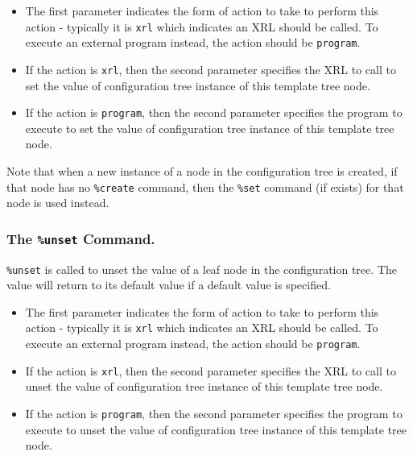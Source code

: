 \documentclass[11pt]{article}
\begin{document}
\begin{itemize}

  \item The first parameter indicates the form of action to take to perform
  this action - typically it is {\tt xrl} which indicates an XRL should
  be called.
  To execute an external program instead, the action should be {\tt program}.

  \item If the action is {\tt xrl}, then the second parameter specifies the
  XRL to call to set the value of configuration tree instance of this template
  tree node.

  \item If the action is {\tt program}, then the second parameter specifies the
  program to execute to set the value of configuration tree instance of this
  template tree node.

\end{itemize}

Note that when a new instance of a node in the configuration tree is created,
if that node has no {\tt \%create} command, then the {\tt \%set}
command (if exists) for that node is used instead.

\subsubsection{The {\tt \%unset} Command.}

{\tt \%unset} is called to unset the value of a leaf node in the
configuration tree.  The value will return to its default value if a
default value is specified.

\begin{itemize}

  \item The first parameter indicates the form of action to take to perform
  this action - typically it is {\tt xrl} which indicates an XRL should
  be called.
  To execute an external program instead, the action should be {\tt program}.

  \item If the action is {\tt xrl}, then the second parameter specifies the
  XRL to call to unset the value of configuration tree instance of this
  template tree node.

  \item If the action is {\tt program}, then the second parameter specifies the
  program to execute to unset the value of configuration tree instance of this
  template tree node.

\end{itemize}
\end{document}
